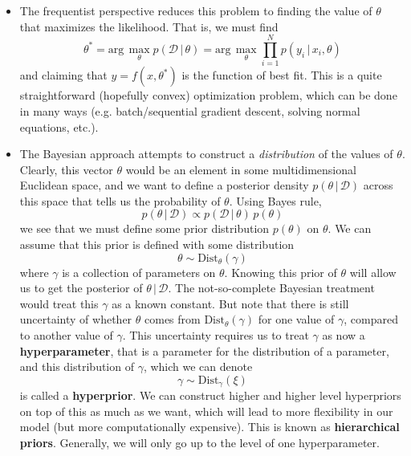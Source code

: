   \begin{itemize}
    \item The frequentist perspective reduces this problem to finding the value of $\theta$ that maximizes the likelihood. That is, we must find
    \begin{equation}
      \theta^* = \text{arg}\, \max_{\theta} p(\mathcal{D}\,|\,\theta) = \text{arg}\, \max_{\theta} \prod_{i=1}^N p(y_i \,|\,x_i, \theta)
    \end{equation}
    and claiming that $y = f(x, \theta^*)$ is the function of best fit. This is a quite straightforward (hopefully convex) optimization problem, which can be done in many ways (e.g. batch/sequential gradient descent, solving normal equations, etc.).

    \item The Bayesian approach attempts to construct a \textit{distribution} of the values of $\theta$. Clearly, this vector $\theta$ would be an element in some multidimensional Euclidean space, and we want to define a posterior density $p(\theta\,|\,\mathcal{D})$ across this space that tells us the probability of $\theta$. Using Bayes rule,
    \begin{equation}
      p(\theta\,|\,\mathcal{D}) \propto p(\mathcal{D}\,|\,\theta) \, p(\theta)
    \end{equation}
    we see that we must define some prior distribution $p(\theta)$ on $\theta$. We can assume that this prior is defined with some distribution
    \begin{equation}
      \theta \sim \text{Dist}_\theta (\gamma)
    \end{equation}
    where $\gamma$ is a collection of parameters on $\theta$. Knowing this prior of $\theta$ will allow us to get the posterior of $\theta\,|\,\mathcal{D}$. The not-so-complete Bayesian treatment would treat this $\gamma$ as a known constant. But note that there is still uncertainty of whether $\theta$ comes from $\text{Dist}_\theta (\gamma)$ for one value of $\gamma$, compared to another value of $\gamma$. This uncertainty requires us to treat $\gamma$ as now a \textbf{hyperparameter}, that is a parameter for the distribution of a parameter, and this distribution of $\gamma$, which we can denote
    \begin{equation}
      \gamma \sim \text{Dist}_\gamma (\xi)
    \end{equation}
    is called a \textbf{hyperprior}. We can construct higher and higher level hyperpriors on top of this as much as we want, which will lead to more flexibility in our model (but more computationally expensive). This is known as \textbf{hierarchical priors}. Generally, we will only go up to the level of one hyperparameter.
  \end{itemize}

